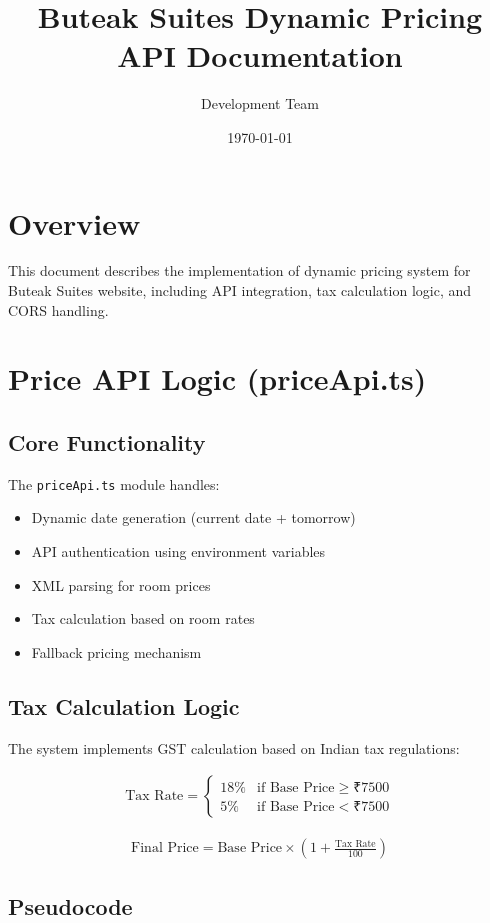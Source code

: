 \documentclass[12pt]{article}
\title{Buteak Suites Dynamic Pricing API Documentation}
\author{Development Team}
\date{\today}
\begin{document}
\maketitle

\section{Overview}
This document describes the implementation of dynamic pricing system for Buteak Suites website, including API integration, tax calculation logic, and CORS handling.

\section{Price API Logic (priceApi.ts)}

\subsection{Core Functionality}
The \texttt{priceApi.ts} module handles:
\begin{itemize}
    \item Dynamic date generation (current date + tomorrow)
    \item API authentication using environment variables
    \item XML parsing for room prices
    \item Tax calculation based on room rates
    \item Fallback pricing mechanism
\end{itemize}

\subsection{Tax Calculation Logic}
The system implements GST calculation based on Indian tax regulations:

\begin{align}
\text{Tax Rate} = \begin{cases}
18\% & \text{if Base Price} \geq ₹7500 \\
5\% & \text{if Base Price} < ₹7500
\end{cases}
\end{align}

\begin{align}
\text{Final Price} = \text{Base Price} \times (1 + \frac{\text{Tax Rate}}{100})
\end{align}

\subsection{Pseudocode}
\end{document}
